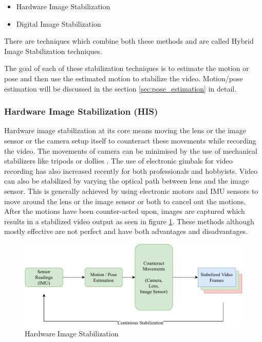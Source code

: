 \begin{itemize}
\item Hardware Image Stabilization
\item Digital Image Stabilization  
\end{itemize}
There are techniques which combine both these methods and are called Hybrid Image Stabilization techniques.

The goal of each of these stabilization techniques is to estimate the motion or pose and then use the estimated motion to stabilize the video. Motion/pose estimation will be discussed in the section \ref{sec:pose_estimation} in detail.

\subsubsection{Hardware Image Stabilization (HIS)}
Hardware image stabilization at its core means moving the lens or the image sensor or the camera setup itself to counteract these movements while recording the video. The movements of camera can be minimised by the use of mechanical stabilizers like tripods or dollies \citep{5995525}. The use of electronic gimbals for video recording has also increased recently for both professionals and hobbyists. Video can also be stabilized by varying the optical path between lens and the image sensor. This is generally achieved by using electronic motors and IMU sensors to move around the lens or the image sensor or both to cancel out the motions. After the motions have been counter-acted upon, images are captured which results in a stabilized video output as seen in figure \ref{fig:his}. These methods although mostly effective are not perfect and have both advantages and disadvantages.

\begin{figure}[H]
\centering
\includegraphics[scale=0.6]{images/fig_chapter2/2_1_his.pdf}
\caption{Hardware Image Stabilization}
\label{fig:his}
\end{figure}

